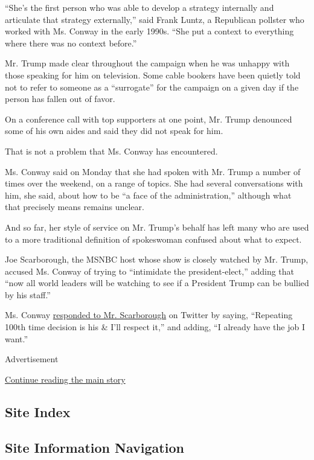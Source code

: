 ``She's the first person who was able to develop a strategy internally
and articulate that strategy externally,'' said Frank Luntz, a
Republican pollster who worked with Ms. Conway in the early 1990s. ``She
put a context to everything where there was no context before.''

Mr. Trump made clear throughout the campaign when he was unhappy with
those speaking for him on television. Some cable bookers have been
quietly told not to refer to someone as a ``surrogate'' for the campaign
on a given day if the person has fallen out of favor.

On a conference call with top supporters at one point, Mr. Trump
denounced some of his own aides and said they did not speak for him.

That is not a problem that Ms. Conway has encountered.

Ms. Conway said on Monday that she had spoken with Mr. Trump a number of
times over the weekend, on a range of topics. She had several
conversations with him, she said, about how to be ``a face of the
administration,'' although what that precisely means remains unclear.

And so far, her style of service on Mr. Trump's behalf has left many who
are used to a more traditional definition of spokeswoman confused about
what to expect.

Joe Scarborough, the MSNBC host whose show is closely watched by Mr.
Trump, accused Ms. Conway of trying to ``intimidate the
president-elect,'' adding that ``now all world leaders will be watching
to see if a President Trump can be bullied by his staff.''

Ms. Conway
\href{https://twitter.com/KellyannePolls/status/802963387168727040}{responded
to Mr. Scarborough} on Twitter by saying, ``Repeating 100th time
decision is his \& I'll respect it,'' and adding, ``I already have the
job I want.''

Advertisement

\protect\hyperlink{after-bottom}{Continue reading the main story}

\hypertarget{site-index}{%
\subsection{Site Index}\label{site-index}}

\hypertarget{site-information-navigation}{%
\subsection{Site Information
Navigation}\label{site-information-navigation}}

